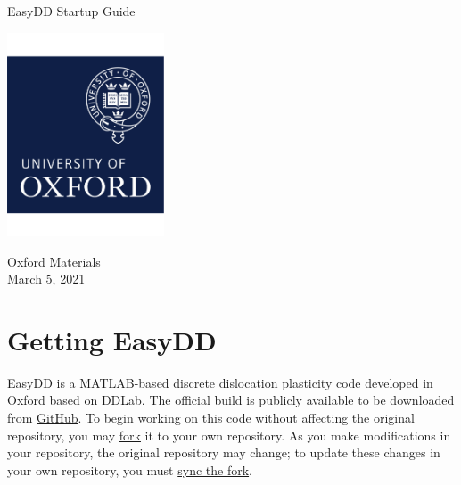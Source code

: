 \documentclass[a4paper,12pt]{article}
\begin{document}

\doublespacing



\begin{titlepage}
    \begin{center}
        \vspace*{3cm}
 
 
 
 
        \Huge
        EasyDD Startup Guide
        
 
 	\vfill
	
	
        \vspace{3cm}
        
        \includegraphics[width=0.35\textwidth]{ox_brand_cmyk_pos_crop1.pdf}
        
 	\vspace{1cm}
 	
 	\LARGE
    Oxford Materials \\
    \Large
    March 5, 2021
    
    \end{center}
\end{titlepage}


\renewcommand{\familydefault}{\sfdefault} %



\tableofcontents
\newpage







\section{Getting EasyDD}


EasyDD is a MATLAB-based discrete dislocation plasticity code developed in Oxford based on DDLab. The official build is publicly available to be downloaded from \href{https://github.com/TarletonGroup/EasyDD}{GitHub}. To begin working on this code without affecting the original repository, you may \href{https://docs.github.com/en/free-pro-team@latest/github/getting-started-with-github/fork-a-repo}{fork} it to your own repository. As you make modifications in your repository, the original repository may change; to update these changes in your own repository, you must \href{https://docs.github.com/en/free-pro-team@latest/github/collaborating-with-issues-and-pull-requests/syncing-a-fork}{sync the fork}.
\end{document}
